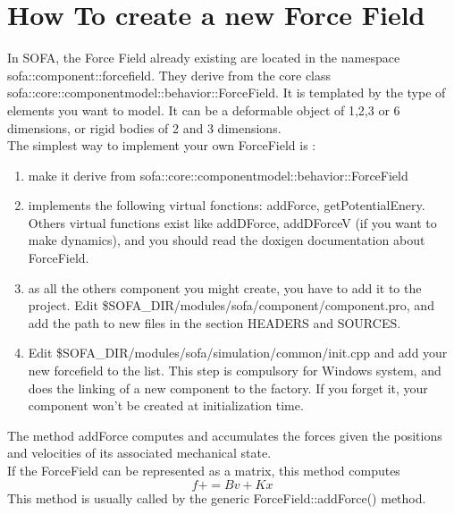 
\section{How To create a new Force Field}

In SOFA, the Force Field already existing are located in the namespace sofa::component::forcefield. They derive from the core class sofa::core::componentmodel::behavior::ForceField. It is templated by the type of elements you want to model. It can be a deformable object of 1,2,3 or 6 dimensions, or rigid bodies of 2 and 3 dimensions.\\
The simplest way to implement your own ForceField is :
\begin{enumerate}
 \item make it derive from sofa::core::componentmodel::behavior::ForceField
 \item implements the following virtual fonctions: addForce, getPotentialEnery. Others virtual functions exist like  addDForce, addDForceV (if you want to make dynamics), and you should read the doxigen documentation about ForceField. 
 \item as all the others component you might create, you have to add it to the project. Edit \$SOFA\_DIR/modules/sofa/component/component.pro, and add the path to new files in the section HEADERS and SOURCES.
 \item Edit \$SOFA\_DIR/modules/sofa/simulation/common/init.cpp and add your new forcefield to the list. This step is compulsory for Windows system, and does the linking of a new component to the factory. If you forget it, your component won't be created at initialization time.
\end{enumerate}

The method addForce computes and accumulates the forces given the positions and velocities of its associated mechanical state.\\
If the ForceField can be represented as a matrix, this method computes
    $$ f += B v + K x $$
     This method is usually called by the generic ForceField::addForce() method.
